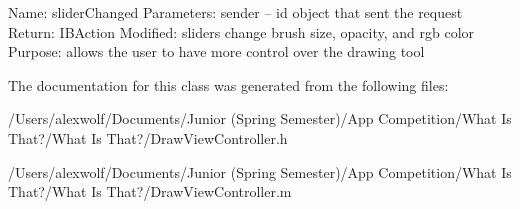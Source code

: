 Name\-: slider\-Changed Parameters\-: sender -- id object that sent the request Return\-: I\-B\-Action Modified\-: sliders change brush size, opacity, and rgb color Purpose\-: allows the user to have more control over the drawing tool 

The documentation for this class was generated from the following files\-:\begin{DoxyCompactItemize}
\item 
/\-Users/alexwolf/\-Documents/\-Junior (\-Spring Semester)/\-App Competition/\-What Is That?/\-What Is That?/Draw\-View\-Controller.\-h\item 
/\-Users/alexwolf/\-Documents/\-Junior (\-Spring Semester)/\-App Competition/\-What Is That?/\-What Is That?/Draw\-View\-Controller.\-m\end{DoxyCompactItemize}
